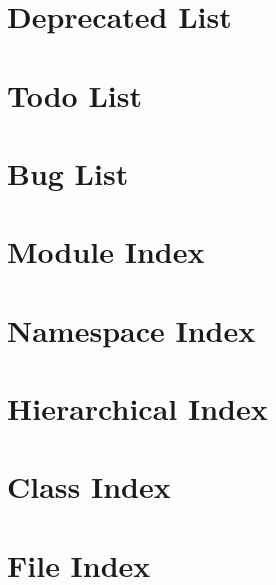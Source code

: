 \let\mypdfximage\pdfximage\def\pdfximage{\immediate\mypdfximage}\documentclass[twoside]{book}
\newcommand{\+}{\discretionary{\mbox{\scriptsize$\hookleftarrow$}}{}{}}
\begin{document}
\chapter{Deprecated List}
\label{deprecated}

\chapter{Todo List}
\label{todo}

\chapter{Bug List}
\label{bug}

\chapter{Module Index}

\chapter{Namespace Index}

\chapter{Hierarchical Index}

\chapter{Class Index}

\chapter{File Index}

\end{document}
